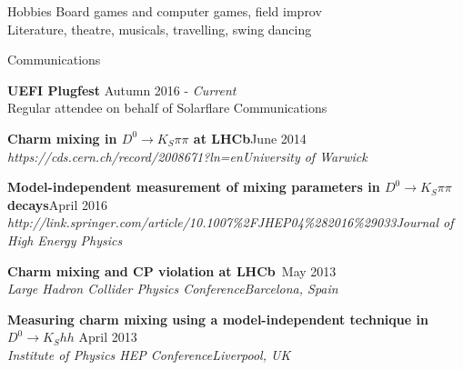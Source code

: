 \documentclass{format/resume} %
\begin{document}

\begin{rSection}{Hobbies}
  Board games and computer games, field improv \\
  Literature, theatre, musicals, travelling, swing dancing \\
\end{rSection}


\begin{rSection}{Communications}

  {\bf UEFI Plugfest} \hfill {Autumn 2016 - \it Current} \\
  { Regular attendee on behalf of Solarflare Communications }

  {\bf Charm mixing in $D^{0}\rightarrow K_{S}\pi\pi$ at LHCb}\hfill{June 2014}\\
  {\it https://cds.cern.ch/record/2008671?ln=en}\hfill{\it University of Warwick}

  {\bf Model-independent measurement of mixing parameters in $D^{0}\rightarrow K_{S}\pi\pi$ decays}\hfill{April 2016}\\
  {\it http://link.springer.com/article/10.1007\%2FJHEP04\%282016\%29033}\hfill{\it Journal of High Energy Physics}


  {\bf Charm mixing and CP violation at LHCb}\hfill{\ May 2013}\\
  {\it Large Hadron Collider Physics Conference}\hfill{\it Barcelona, Spain}

  {\bf Measuring charm mixing using a model-independent technique in $D^{0} \rightarrow K_{S}hh$}\hfill{ April 2013}\\
  {\it Institute of Physics HEP Conference}\hfill{\it Liverpool, UK}

\end{rSection}

\end{document}
